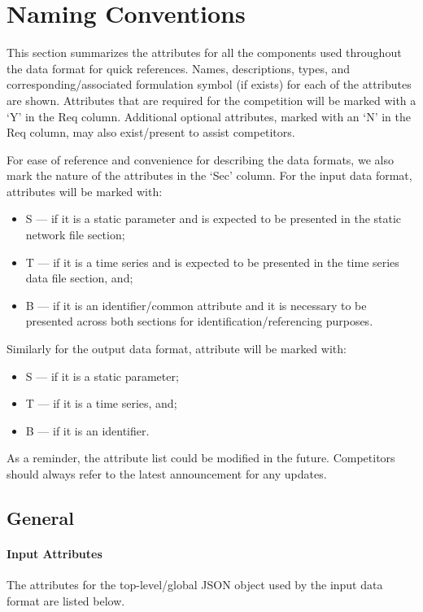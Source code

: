 \documentclass{article}
\begin{document}
\section{Naming Conventions}
\label{sec:naming}
This section summarizes the attributes for all the components used throughout the data format for quick references. 
Names, descriptions, types, and corresponding/associated formulation symbol (if exists) for each of the attributes are shown.
Attributes that are required for the competition 
will be marked with a `Y' in the Req column. 
Additional optional attributes, marked with an `N' in the Req column, may also exist/present to assist competitors.

For ease of reference and convenience for describing the data formats, we also 
mark the nature of the attributes in the `Sec' column.
For the input data format, attributes will be marked with:
\begin{itemize}
\item S --- if it is a static parameter and is expected to be presented in the static network file section;
\item T --- if it is a time series and is expected to be presented in the time series data file section, and; 
\item B --- if it is an identifier/common attribute and it is necessary to be presented across both sections for identification/referencing purposes.
\end{itemize}
Similarly for the output data format, attribute will be marked with:
\begin{itemize}
\item S --- if it is a static parameter; 
\item T --- if it is a time series, and;
\item B --- if it is an identifier.
\end{itemize}
As a reminder, the attribute list could be modified in the future.
Competitors should always refer to the latest announcement for any 
updates.





\subsection{General}
\label{nom:top-level}

\paragraph{Input Attributes}
The attributes for the top-level/global JSON object 
used by the input data format are listed below.
\end{document}
